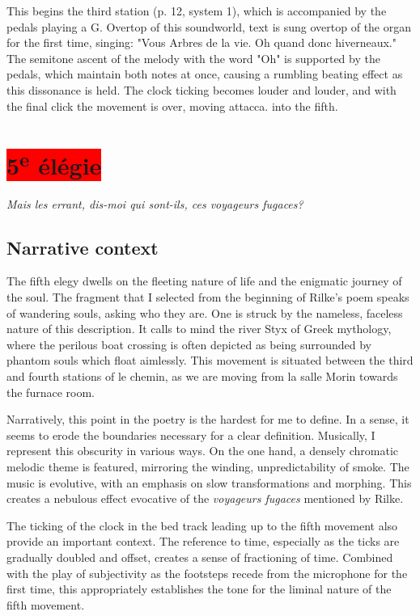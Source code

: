 \documentclass[12pt,twoside,maitrise]{dms_ks}
\theoremstyle{definition}
\begin{document}
{This begins the third station (p. 12, system 1), which is accompanied by the pedals playing a G. Overtop of this soundworld, text is sung overtop of the organ for the first time, singing: "Vous Arbres de la vie. Oh quand donc hiverneaux." The semitone ascent of the melody with the word "Oh" is supported by the pedals, which maintain both notes at once, causing a rumbling beating effect as this dissonance is held. The clock ticking becomes louder and louder, and with the final click the movement is over, moving attacca. into the fifth.


\section{\colorbox{red}{5\textsuperscript{e} élégie}}

\epigraph{\textit{Mais les errant, dis-moi qui sont-ils, ces voyageurs fugaces?}}{}

\subsection{Narrative context}

The fifth elegy dwells on the fleeting nature of life and the enigmatic journey of the soul. The fragment that I selected from the beginning of Rilke's poem speaks of wandering souls, asking who they are. One is struck by the nameless, faceless nature of this description. It calls to mind the river Styx of Greek mythology, where the perilous boat crossing is often depicted as being surrounded by phantom souls which float aimlessly. This movement is situated between the third and fourth stations of le chemin, as we are moving from la salle Morin towards the furnace room. 

Narratively, this point in the poetry is the hardest for me to define. In a sense, it seems to erode the boundaries necessary for a clear definition. Musically, I represent this obscurity in various ways. On the one hand, a densely chromatic melodic theme is featured, mirroring the winding, unpredictability of smoke. The music is evolutive, with an emphasis on slow transformations and morphing. This creates a nebulous effect evocative of the \textit{voyageurs fugaces} mentioned by Rilke. 

The ticking of the clock in the bed track leading up to the fifth movement also provide an important context. The reference to time, especially as the ticks are gradually doubled and offset, creates a sense of fractioning of time. Combined with the play of subjectivity as the footsteps recede from the microphone for the first time, this appropriately establishes the tone for the liminal nature of the fifth movement.

}
\end{document}
